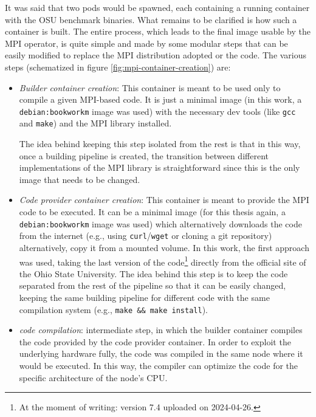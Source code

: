 It was said that two pods would be spawned, each containing a running container
with the OSU benchmark binaries. What remains to be clarified is how such a
container is built.
The entire process, which leads to the final image usable by the MPI operator,
is quite simple and made by some modular steps that can be easily modified to
replace the MPI distribution adopted or the code.
The various steps (schematized in figure \ref{fig:mpi-container-creation}) are:
\begin{itemize}
  \itemsep0em
  \item \textit{Builder container creation}: This container is meant to be used
    only to compile a given MPI-based code. It is just a minimal image (in this
    work, a \texttt{debian:bookworkm} image was used) with the necessary dev
    tools (like \texttt{gcc} and \texttt{make}) and the MPI library installed.

    The idea behind keeping this step isolated from the rest is that in this way,
    once a building pipeline is created, the transition between different
    implementations of the MPI library is straightforward since this is the only
    image that needs to be changed.

  \item \textit{Code provider container creation}: This container is meant to
    provide the MPI code to be executed. It can be a minimal image (for this
    thesis again, a \texttt{debian:bookworkm} image was used) which
    alternatively downloads the code from the internet (e.g., using
    \texttt{curl}/\texttt{wget} or cloning a git repository) alternatively, copy
    it from a mounted volume. In this work, the first approach was used, taking
    the last version of the code\footnote{At the moment of writing: version 7.4
      uploaded on 2024-04-26.} directly from the official site of the Ohio State
    University.
    The idea behind this step is to keep the code separated from the rest of the
    pipeline so that it can be easily changed, keeping the same building pipeline
    for different code with the same compilation system (e.g., \texttt{make \&\&
      make install}).

  \item \textit{code compilation}: intermediate step, in which the builder
    container compiles the code provided by the code provider container. In
    order to exploit the underlying hardware fully, the code was compiled in the
    same node where it would be executed. In this way, the
    compiler can optimize the code for the specific architecture of the node's
    CPU.


\end{itemize}

